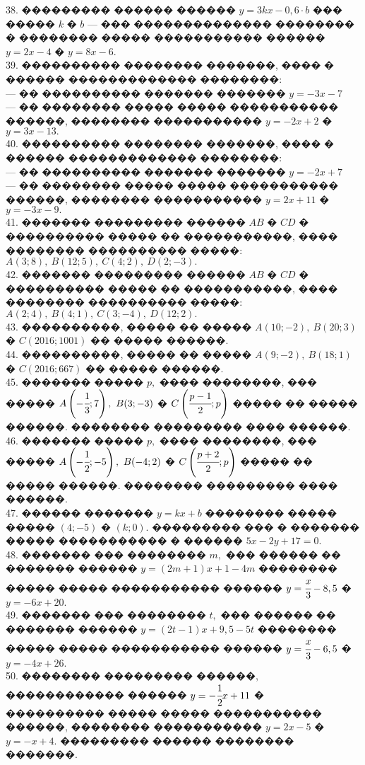 \documentclass[12pt]{article}
\begin{document}
38. ��������� ������ ������ $y=3kx-0,6\cdot b$ ��� ����� $k$ � $b$ --- ��� �������������� �������� � �������� ����� ����������� ������ $y=2x-4$ � $y=8x-6.$\\
39. ���������� �������� �������, ���� � ������ ������������� ��������:\\
--- �� ���������� ������� ������� $y=-3x-7$\\
--- �� �������� ����� ����� ����������� ������, �������� ����������� $y=-2x+2$ � $y=3x-13.$\\
40. ���������� �������� �������, ���� � ������ ������������� ��������:\\
--- �� ���������� ������� ������� $y=-2x+7$\\
--- �� �������� ����� ����� ����������� ������, �������� ����������� $y=2x+11$ � $y=-3x-9.$\\
41. ������� ��������� ������ $AB$ � $CD$ � ���������� ����� �� �����������, ���� �������� ���������� �����: $A(3;8),\ B(12;5),\ C(4;2),\ D(2;-3).$\\
42. ������� ��������� ������ $AB$ � $CD$ � ���������� ����� �� �����������, ���� �������� ���������� �����: $A(2;4),\ B(4;1),\ C(3;-4),\ D(12;2).$\\
43. ����������, ����� �� ����� $A(10;-2),\ B(20;3)$ � $C(2016;1001)$ �� ����� ������.\\
44. ����������, ����� �� ����� $A(9;-2),\ B(18;1)$ � $C(2016;667)$ �� ����� ������.\\
45. ������� ����� $p,$ ���� ��������, ��� ����� $A\left(-\cfrac{1}{3};7\right),\ B(3;-3)$ � $C\left(\cfrac{p-1}{2}; p\right)$ ����� �� ����� ������. �������� ��������� ���� ������.\\
46. ������� ����� $p,$ ���� ��������, ��� ����� $A\left(-\cfrac{1}{2};-5\right),\ B(-4;2)$ � $C\left(\cfrac{p+2}{2}; p\right)$ ����� �� ����� ������. �������� ��������� ���� ������.\\
47. ������ ������� $y=kx+b$ �������� ����� ����� $(4;-5)$ � $(k;0).$ ��������� ��� � ������� ����� ����������� � ������ $5x-2y+17=0.$\\
48. ������� ��� �������� $m,$ ��� ������ �� ������� ������ $y=(2m+1)x+1-4m$ �������� ����� ����� ����������� ������ $y=\cfrac{x}{3}-8,5$ � $y=-6x+20.$\\
49. ������� ��� �������� $t,$ ��� ������ �� ������� ������ $y=(2t-1)x+9,5-5t$ �������� ����� ����� ����������� ������ $y=\cfrac{x}{3}-6,5$ � $y=-4x+26.$\\
50. �������� ��������� ������, ������������ ������ $y=-\cfrac{1}{2}x+11$  � ���������� ����� ����� ����������� ������, �������� ����������� $y=2x-5$ � $y=-x+4.$ ��������� ������ �������� �������.\\
\end{document}
